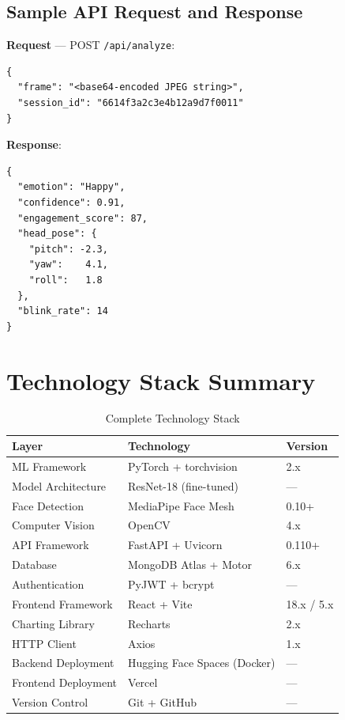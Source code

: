 \begin{singlespacing}
\vspace{0.3em}
\section*{Sample API Request and Response}
\vspace{-0.3em}
\textbf{Request} — POST \texttt{/api/analyze}:
\vspace{-0.5em}
\begin{verbatim}
{
  "frame": "<base64-encoded JPEG string>",
  "session_id": "6614f3a2c3e4b12a9d7f0011"
}
\end{verbatim}
\vspace{-1em}
\textbf{Response}:
\vspace{-0.5em}
\begin{verbatim}
{
  "emotion": "Happy",
  "confidence": 0.91,
  "engagement_score": 87,
  "head_pose": {
    "pitch": -2.3,
    "yaw":    4.1,
    "roll":   1.8
  },
  "blink_rate": 14
}
\end{verbatim}

\end{singlespacing}


\section*{Technology Stack Summary}

\begin{table}[H]
\centering
\caption{Complete Technology Stack}
\begin{tabular}{lll}
\toprule
\textbf{Layer}        & \textbf{Technology}         & \textbf{Version} \\
\midrule
ML Framework          & PyTorch + torchvision       & 2.x \\
Model Architecture    & ResNet-18 (fine-tuned)      & --- \\
Face Detection        & MediaPipe Face Mesh         & 0.10+ \\
Computer Vision       & OpenCV                      & 4.x \\
API Framework         & FastAPI + Uvicorn           & 0.110+ \\
Database              & MongoDB Atlas + Motor       & 6.x \\
Authentication        & PyJWT + bcrypt              & --- \\
Frontend Framework    & React + Vite                & 18.x / 5.x \\
Charting Library      & Recharts                    & 2.x \\
HTTP Client           & Axios                       & 1.x \\
Backend Deployment    & Hugging Face Spaces (Docker)& --- \\
Frontend Deployment   & Vercel                      & --- \\
Version Control       & Git + GitHub                & --- \\
\bottomrule
\end{tabular}
\end{table}

